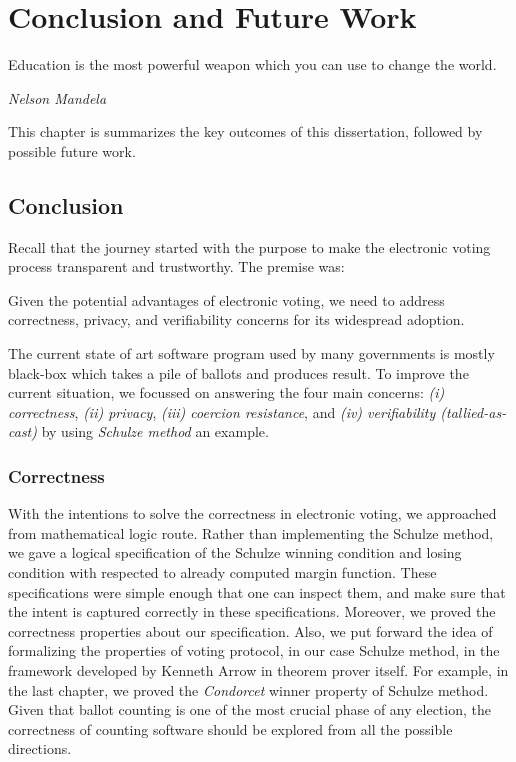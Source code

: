 \chapter{Conclusion and Future Work}
\label{cha:conc}

\epigraph{Education is the most powerful weapon which you can use to change the world.} 
{\textit{Nelson Mandela}}

This chapter is summarizes the key outcomes of this dissertation, followed by possible 
future work. 

\section{Conclusion}
Recall that the journey started with the purpose to make the electronic voting 
process transparent and trustworthy.  The premise was:

\begin{displayquote}
Given the potential advantages of electronic voting, we need to address correctness,
privacy, and verifiability concerns for its widespread adoption.
\end{displayquote}

The current state of 
art software program used by many governments is mostly black-box which 
takes a pile of ballots and produces result.  To improve the current situation, 
we focussed on answering the 
four main concerns: \textit{(i) correctness}, \textit{(ii) privacy},
\textit{(iii) coercion resistance}, and \textit{(iv) verifiability (tallied-as-cast)} by 
using \textit{Schulze method} an example. 

\subsection{Correctness}
With the intentions to solve the 
correctness in electronic voting, we approached from 
mathematical logic route.  Rather than implementing the Schulze method, 
we gave a logical specification of the Schulze winning condition and losing 
condition with respected to already computed margin function. 
These specifications were simple enough that 
one can inspect them, and 
make sure that the intent is captured correctly in these specifications. 
Moreover, we proved the correctness properties about our specification.
Also, we put forward the idea of formalizing the properties 
of voting protocol, in our case Schulze method, in the framework developed by Kenneth Arrow 
in theorem prover itself. For example, 
in the last chapter, we proved the \textit{Condorcet} winner property 
of Schulze method. Given that ballot counting is one of the most 
crucial phase of any election, the correctness of counting software 
should be explored from all the possible directions. 

